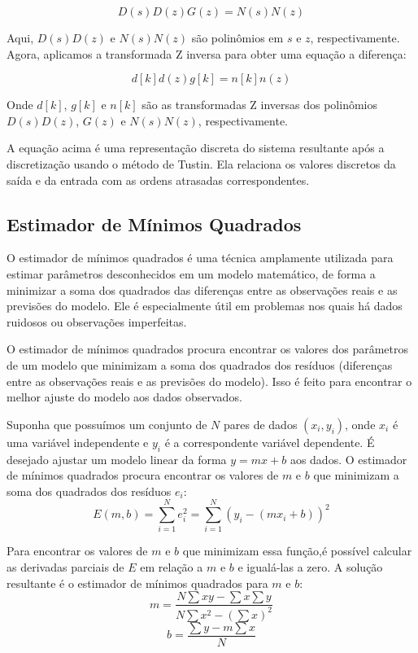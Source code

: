 \documentclass[a4paper,12pt]{article}
\begin{document}
\begin{equation}
    D(s)D(z)G(z) = N(s)N(z)\tag{2.6.2}
\end{equation}

Aqui, \(D(s)D(z)\) e \(N(s)N(z)\) são polinômios em \(s\) e \(z\), respectivamente. Agora, aplicamos a transformada Z inversa para obter uma equação a diferença:

\begin{equation}
    d[k]d(z)g[k] = n[k]n(z)\tag{2.6.3}
\end{equation}

Onde \(d[k]\), \(g[k]\) e \(n[k]\) são as transformadas Z inversas dos polinômios \(D(s)D(z)\), \(G(z)\) e \(N(s)N(z)\), respectivamente.

A equação acima é uma representação discreta do sistema resultante após a discretização usando o método de Tustin. Ela relaciona os valores discretos da saída e da entrada com as ordens atrasadas correspondentes.

\subsection{Estimador de Mínimos Quadrados}

O estimador de mínimos quadrados é uma técnica amplamente utilizada para estimar parâmetros desconhecidos em um modelo matemático, de forma a minimizar a soma dos quadrados das diferenças entre as observações reais e as previsões do modelo. Ele é especialmente útil em problemas nos quais há dados ruidosos ou observações imperfeitas.

O estimador de mínimos quadrados procura encontrar os valores dos parâmetros de um modelo que minimizam a soma dos quadrados dos resíduos (diferenças entre as observações reais e as previsões do modelo). Isso é feito para encontrar o melhor ajuste do modelo aos dados observados.

Suponha que possuímos um conjunto de \(N\) pares de dados \((x_i, y_i)\), onde \(x_i\) é uma variável independente e \(y_i\) é a correspondente variável dependente. É desejado ajustar um modelo linear da forma \(y = mx + b\) aos dados. O estimador de mínimos quadrados procura encontrar os valores de \(m\) e \(b\) que minimizam a soma dos quadrados dos resíduos \(e_i\):
\begin{equation}
    E(m, b) = \sum_{i=1}^N e_i^2 = \sum_{i=1}^N (y_i - (mx_i + b))^2\tag{2.7.1}
\end{equation}

Para encontrar os valores de \(m\) e \(b\) que minimizam essa função,é possível calcular as derivadas parciais de \(E\) em relação a \(m\) e \(b\) e igualá-las a zero. A solução resultante é o estimador de mínimos quadrados para \(m\) e \(b\):
\begin{equation}
    m = \frac{N\sum xy - \sum x \sum y}{N\sum x^2 - (\sum x)^2}\tag{2.7.2}
\end{equation}
\begin{equation}
    b = \frac{\sum y - m \sum x}{N}\tag{2.7.3}
\end{equation}
\end{document}
